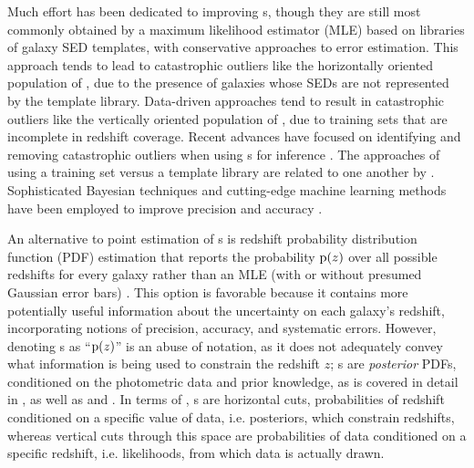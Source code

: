 Much effort has been dedicated to improving \pz s, though they are still most commonly obtained by a maximum likelihood estimator (MLE) based on libraries of galaxy SED templates, with conservative approaches to error estimation.
This approach tends to lead to catastrophic outliers like the horizontally oriented population of , due to the presence of galaxies whose SEDs are not represented by the template library.
Data-driven approaches tend to result in catastrophic outliers like the vertically oriented population of , due to training sets that are incomplete in redshift coverage.
Recent advances have focused on identifying and removing catastrophic outliers when using \pz s for 
inference \citep{Gorecki2014}.  
The approaches of using a training set versus a template library are related to one another by \citet{Budavari2009}.
Sophisticated Bayesian techniques and cutting-edge machine learning methods have been employed to improve precision \citep{Carliles2010} and accuracy \citep{Sadeh2015}. 

An alternative to point estimation of \pz s is redshift probability distribution function (PDF) estimation that reports the probability $\mathrm{p}(z)$ over all possible redshifts for every galaxy rather than an MLE (with or without presumed Gaussian error bars) \citep{Koo1999}.  
This option is favorable because it contains more potentially useful information about the uncertainty on each galaxy's redshift, incorporating notions of precision, accuracy, and systematic errors.
However, denoting \pzpdf s as ``$\mathrm{p}(z)$'' is an abuse of notation, as it does not adequately convey what information is being used to constrain the redshift $z$; \pzpdf s are \textit{posterior} PDFs, conditioned on the photometric data and prior knowledge, as is covered in detail in , as well as  and .
In terms of , \pzpdf s are horizontal cuts, probabilities of redshift conditioned on a specific value of data, i.e. posteriors, which constrain redshifts, whereas vertical cuts through this space are probabilities of data conditioned on a specific redshift, i.e. likelihoods, from which data is actually drawn.


